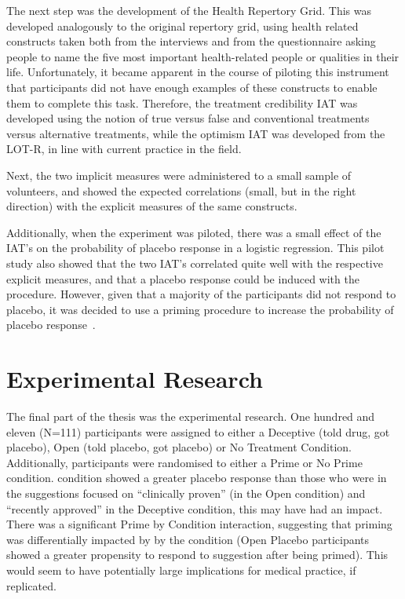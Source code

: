 The next step was the development of the Health Repertory Grid. This
was developed analogously to the original repertory grid, using health
related constructs taken both from the interviews and from the
questionnaire asking people to name the five most important
health-related people or qualities in their life. Unfortunately, it
became apparent in the course of piloting this instrument that
participants did not have enough examples of these constructs to
enable them to complete this task. Therefore, the treatment
credibility IAT was developed using the notion of true versus false
and conventional treatments versus alternative treatments, while the
optimism IAT was developed from the LOT-R, in line with current
practice in the field.

Next, the two implicit measures were administered to a small sample of
volunteers, and showed the expected correlations (small, but in the
right direction) with the explicit measures of the same constructs.

Additionally, when the experiment was piloted, there was a small
effect of the IAT's on the probability of placebo response in a
logistic regression. This pilot study also showed that the two IAT's
correlated quite well with the respective explicit measures, and that
a placebo response could be induced with the procedure. However, given
that a majority of the participants did not respond to placebo, it was
decided to use a priming procedure to increase the probability of
placebo response~\cite{Geers2005a}.

\section{Experimental Research}
\label{sec:exper-rese}

The final part of the thesis was the experimental research. One
hundred and eleven (N=111) participants were assigned to either a
Deceptive (told drug, got placebo), Open (told placebo, got placebo)
or No Treatment Condition. Additionally, participants were randomised
to either a Prime or No Prime condition. %
condition showed a greater placebo response than those who were in the
suggestions focused on ``clinically proven'' (in the Open condition) %
and ``recently approved'' in the Deceptive condition, this may have %
had an impact. There was a significant Prime by Condition interaction,
suggesting that priming was differentially impacted by by the
condition (Open Placebo participants showed a greater propensity to
respond to suggestion after being primed). This would seem to have
potentially large implications for medical practice, if replicated.

